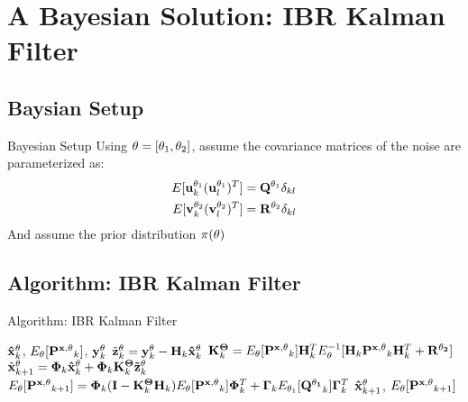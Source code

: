 \section{A Bayesian Solution: IBR Kalman Filter}
\begin{frame}
    \tableofcontents[currentsection]
\end{frame}

\subsection{Baysian Setup}
\begin{frame}{Bayesian Setup}
Using ${\bf \theta}=[\theta_1, \theta_2]$, assume the covariance matrices of the noise are parameterized as: 
\begin{align*}
E[{\bf u}^{\theta_1}_k ({\bf u}^{\theta_1}_l)^T]&={\bf Q}^{\theta_1}\delta_{kl}\\
E[{\bf v}^{\theta_2}_k ({\bf v}^{\theta_2}_l)^T]&={\bf R}^{\theta_2}\delta_{kl}
\end{align*}
And assume the prior distribution $\pi({\bf \theta})$
\end{frame}

\subsection{Algorithm: IBR Kalman Filter}
\begin{frame}{Algorithm: IBR Kalman Filter}

\begin{algorithm}[H]
\caption{IBR Kalman Filter}
\begin{algorithmic}[1]
\REQUIRE ${\bf \hat x}^{\theta}_k$, $E_\theta[{\bf P^{x, \theta}}_{k}]$, ${\bf y}^{\theta}_k$
\STATE $\tilde {\bf z}^{\bf \theta}_k = {\bf y}^{\bf \theta}_k - {\bf H}_k{\bf \hat x}^{\bf \theta}_k$
\STATE ${\bf K}^{\bf \Theta}_k = E_\theta[{\bf P^{x, \theta}}_k]{\bf H}^T_kE_\theta^{-1}[{\bf H}_k{\bf P^{x, \theta}}_k{\bf H}^T_k+{\bf R^{\theta_2}}]$
\STATE $\hat{\bf x}^{\theta}_{k+1} = {\bf \Phi}_k{\bf \hat x}^{\theta}_k+{\bf \Phi}_k{\bf K}^{\bf \Theta}_k{\bf \tilde z}^{\theta}_k$
\STATE $E_\theta[{\bf P^{x, \theta}}_{k+1}] = {\bf \Phi}_k({\bf I}-{\bf K}^{\bf \Theta}_k{\bf H}_k)E_\theta[{\bf P^{x, \theta}}_k]{\bf \Phi}^T_k + {\bf \Gamma}_kE_{\theta_1}[{\bf Q^{\theta_1}}_k]{\bf \Gamma}_k^T$
\ENSURE ${\bf \hat x}^{\theta}_{k+1}$, $E_\theta[{\bf P^{x, \theta}}_{k+1}]$
\end{algorithmic}
\end{algorithm}
\end{frame}